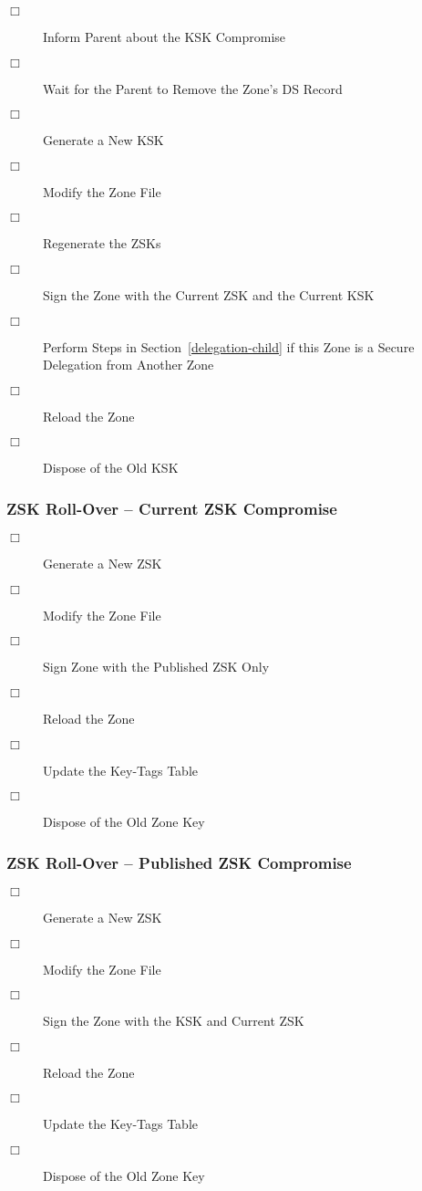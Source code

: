\begin{description}
\item [$\Box$] Inform Parent about the KSK Compromise
\item [$\Box$] Wait for the Parent to Remove the Zone's DS Record
\item [$\Box$] Generate a New KSK
\item [$\Box$] Modify the Zone File
\item [$\Box$] Regenerate the ZSKs
\item [$\Box$] Sign the Zone with the Current ZSK and the Current KSK
\item [$\Box$] Perform Steps in Section~\ref{delegation-child} if this Zone is a Secure Delegation from Another Zone
\item [$\Box$] Reload the Zone
\item [$\Box$] Dispose of the Old KSK
\end{description}


\subsubsection{ZSK Roll-Over -- Current ZSK Compromise}

\begin{description}
\item [$\Box$] Generate a New ZSK
\item [$\Box$] Modify the Zone File
\item [$\Box$] Sign Zone with the Published ZSK Only
\item [$\Box$] Reload the Zone
\item [$\Box$] Update the Key-Tags Table
\item [$\Box$] Dispose of the Old Zone Key
\end{description}


\subsubsection{ZSK Roll-Over -- Published ZSK Compromise}

\begin{description}
\item [$\Box$] Generate a New ZSK
\item [$\Box$] Modify the Zone File
\item [$\Box$] Sign the Zone with the KSK and Current ZSK
\item [$\Box$] Reload the Zone
\item [$\Box$] Update the Key-Tags Table
\item [$\Box$] Dispose of the Old Zone Key
\end{description}

